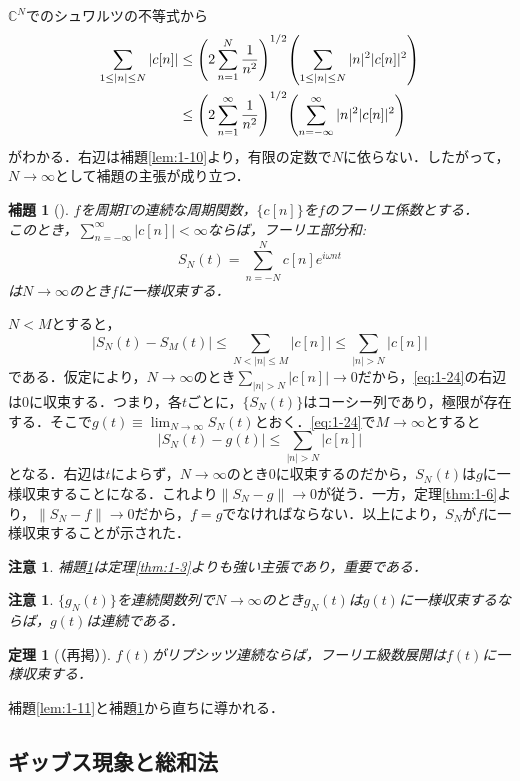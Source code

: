 \documentclass[dvipdfmx,a4j,10pt]{jsarticle}
\makeatletter
\theoremstyle{mystyle1}
\newtheorem{theorem}[definition]{定理}
\newtheorem{lemma}[definition]{補題}
\theoremstyle{mystyle3}
\theoremstyle{mystyle4}
\newtheorem{note}{注意}[section]
\theoremstyle{mystyle2}
\newtheorem{note*}{注意}
\renewenvironment{proof}[1][\proofname]{\par
  \pushQED{\qed}%
  \normalfont
  \topsep6\p@\@plus6\p@ \trivlist
  \item[\hskip\labelsep{\bfseries\sffamily #1}]\ignorespaces
}{%
  \popQED\endtrivlist\@endpefalse
}
\renewcommand\proofname{証明}
\newenvironment{lem}[1][]
{\begin{tcolorbox}[
    enhanced,
    boxrule=0pt,
    arc=0mm,
    frame hidden,
    borderline west={2pt}{-4pt}{yellow!90!black},
    breakable = true
    ]
    \begin{lemma}[#1]
}
{\end{lemma}\end{tcolorbox}}
\newenvironment{thm}[1][]
{\begin{tcolorbox}[
    enhanced,
    boxrule=0pt,
    arc=0mm,
    frame hidden,
    borderline west={2pt}{-4pt}{red},
    breakable = true
    ]
    \begin{theorem}[#1]
}
{\end{theorem}\end{tcolorbox}}
\makeatother
\begin{document}
\begin{proof}
    $\mathbb{C}^N$でのシュワルツの不等式から
    \[
        \begin{split}
            \sum_{1\leq|n|\leq N}|c[n]|
            &\leq\mleft(2\sum_{n=1}^N\frac{1}{n^2}\mright)^{1/2}\mleft(\sum_{1\leq|n|\leq N}|n|^2|c[n]|^2\mright) \\
            &\leq\mleft(2\sum_{n=1}^\infty\frac{1}{n^2}\mright)^{1/2}\mleft(\sum_{n=-\infty}^\infty |n|^2|c[n]|^2\mright) 
        \end{split}
    \]
    がわかる．右辺は補題\ref{lem:1-10}より，有限の定数で$N$に依らない．したがって，$N\to\infty$として補題の主張が成り立つ．
\end{proof}

\begin{lem}\label{lem:1-12}
    $f$を周期$T$の連続な周期関数，$\{c[n]\}$を$f$のフーリエ係数とする．\\ このとき，$\sum_{n=-\infty}^\infty |c[n]|<\infty$ならば，フーリエ部分和:
    \[
        S_N(t)=\sum_{n=-N}^N c[n]e^{i\omega nt}
    \]
    は$N\to\infty$のとき$f$に一様収束する．
\end{lem}

\begin{proof}
    $N<M$とすると，
    \begin{equation}\label{eq:1-24}
        |S_N(t)-S_M(t)|\leq\sum_{N<|n|\leq M}|c[n]|\leq\sum_{|n|>N}|c[n]|
    \end{equation}
    である．仮定により，$N\to\infty$のとき$\sum_{|n|>N}|c[n]|\to 0$だから，\eqref{eq:1-24}の右辺は$0$に収束する．つまり，各$t$ごとに，$\{S_N(t)\}$はコーシー列であり，極限が存在する．そこで$g(t)\equiv\lim_{N\to\infty}S_N(t)$とおく．\eqref{eq:1-24}で$M\to\infty$とすると
    \[
        |S_N(t)-g(t)|\leq\sum_{|n|>N}|c[n]|
    \]
    となる．右辺は$t$によらず，$N\to\infty$のとき$0$に収束するのだから，$S_N(t)$は$g$に一様収束することになる．これより$\|S_N-g\|\to 0$が従う．一方，定理\ref{thm:1-6}より，$\|S_N-f\|\to 0$だから，$f=g$でなければならない．以上により，$S_N$が$f$に一様収束することが示された． 
\end{proof}

\begin{note*}
    補題\ref{lem:1-12}は定理\ref{thm:1-3}よりも強い主張であり，重要である．
\end{note*}

\begin{note}
    $\{g_N(t)\}$を連続関数列で$N\to\infty$のとき$g_N(t)$は$g(t)$に一様収束するならば，$g(t)$は連続である．
\end{note}

\setcounter{definition}{2}

\begin{thm}[（再掲）]
    $f(t)$がリプシッツ連続ならば，フーリエ級数展開は$f(t)$に一様収束する．
\end{thm}

\begin{proof}
    補題\ref{lem:1-11}と補題\ref{lem:1-12}から直ちに導かれる．
\end{proof}

\setcounter{definition}{12}

\subsection{ギッブス現象と総和法}
\end{document}
